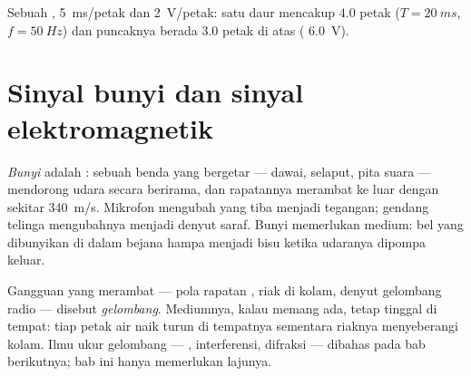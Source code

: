 \begin{omfigure}

{\small Sebuah ,  \qty{5}{ms}/petak dan 
\qty{2}{V}/petak: satu daur mencakup $4.0$ petak ($T = \qty{20}{ms}$,
$f = \qty{50}{Hz}$) dan puncaknya berada $3.0$ petak di atas (
\qty{6.0}{V}).}
\end{omfigure}

\section{Sinyal bunyi dan sinyal elektromagnetik}

\begin{definition}[Bunyi]\label{def:g10:signals-and-waves:sound}
\emph{Bunyi} adalah  : sebuah benda yang
bergetar --- dawai, selaput, pita suara --- mendorong udara secara
berirama, dan rapatannya merambat ke luar dengan sekitar \qty{340}{m/s}.
Mikrofon mengubah  yang tiba menjadi tegangan; gendang telinga
mengubahnya menjadi denyut saraf. Bunyi memerlukan medium: bel yang
dibunyikan di dalam bejana hampa menjadi bisu ketika udaranya dipompa
keluar.
\end{definition}

\begin{definition}[Gelombang]\label{def:g10:signals-and-waves:wave}
Gangguan yang merambat --- pola rapatan , riak di kolam, denyut
gelombang radio --- disebut \emph{gelombang}.
Mediumnya, kalau memang ada, tetap tinggal di tempat: tiap petak air
naik turun di tempatnya sementara riaknya menyeberangi kolam. Ilmu ukur
gelombang --- , interferensi, difraksi --- dibahas pada
bab berikutnya; bab ini hanya memerlukan lajunya.
\end{definition}

